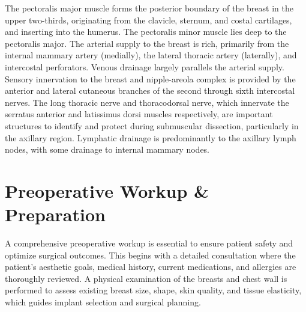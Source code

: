 The pectoralis major muscle forms the posterior boundary of the breast in the upper two-thirds, originating from the clavicle, sternum, and costal cartilages, and inserting into the humerus. The pectoralis minor muscle lies deep to the pectoralis major. The arterial supply to the breast is rich, primarily from the internal mammary artery (medially), the lateral thoracic artery (laterally), and intercostal perforators. Venous drainage largely parallels the arterial supply. Sensory innervation to the breast and nipple-areola complex is provided by the anterior and lateral cutaneous branches of the second through sixth intercostal nerves. The long thoracic nerve and thoracodorsal nerve, which innervate the serratus anterior and latissimus dorsi muscles respectively, are important structures to identify and protect during submuscular dissection, particularly in the axillary region. Lymphatic drainage is predominantly to the axillary lymph nodes, with some drainage to internal mammary nodes.

\section*{Preoperative Workup \& Preparation}
A comprehensive preoperative workup is essential to ensure patient safety and optimize surgical outcomes. This begins with a detailed consultation where the patient's aesthetic goals, medical history, current medications, and allergies are thoroughly reviewed. A physical examination of the breasts and chest wall is performed to assess existing breast size, shape, skin quality, and tissue elasticity, which guides implant selection and surgical planning.

